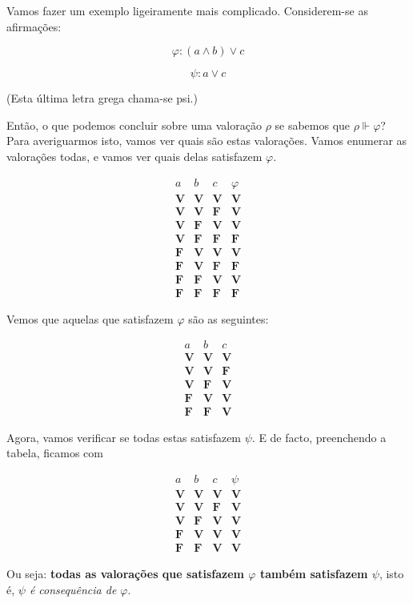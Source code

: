 \documentclass{article}
\theoremstyle{definition}
\theoremstyle{remark}
\newcommand{\V}{\mathbf{V}}
\newcommand{\F}{\mathbf{F}}
\begin{document}
	Vamos fazer um exemplo ligeiramente mais complicado. Considerem-se as afirmações:
	
	\[ \varphi : (a \land b) \lor c \]
	
	\[ \psi : a \lor c \]
	
	(Esta última letra grega chama-se psi.)
	
	Então, o que podemos concluir sobre uma valoração $\rho$ se sabemos que $\rho \Vdash \varphi$? Para averiguarmos isto, vamos ver quais são estas valorações. Vamos enumerar as valorações todas, e vamos ver quais delas satisfazem $\varphi$.
	
	\[
	\begin{array}{c|c|c|c}
	a & b & c & \varphi \\
	\hline
	\V & \V & \V & \V\\
	\V & \V & \F & \V\\
	\V & \F & \V & \V\\
	\V & \F & \F & \F\\
	\F & \V & \V & \V\\
	\F & \V & \F & \F\\
	\F & \F & \V & \V\\
	\F & \F & \F & \F
	\end{array}
	\]
	
	Vemos que aquelas que satisfazem $\varphi$ são as seguintes:
	
	
	\[
	\begin{array}{c|c|c}
	a & b & c \\
	\hline
	\V & \V & \V\\
	\V & \V & \F\\
	\V & \F & \V\\
	\F & \V & \V\\
	\F & \F & \V
	\end{array}
	\]
	
	Agora, vamos verificar se todas estas satisfazem $\psi$. E de facto, preenchendo a tabela, ficamos com
	
	\[
	\begin{array}{c|c|c|c}
	a & b & c & \psi \\
	\hline
	\V & \V & \V & \V\\
	\V & \V & \F & \V\\
	\V & \F & \V & \V\\
	\F & \V & \V & \V\\
	\F & \F & \V & \V
	\end{array}
	\]
	
	Ou seja: \textbf{todas as valorações que satisfazem $\varphi$ também satisfazem $\psi$}, isto é, \emph{$\psi$ é consequência de $\varphi$}.
	
\end{document}
